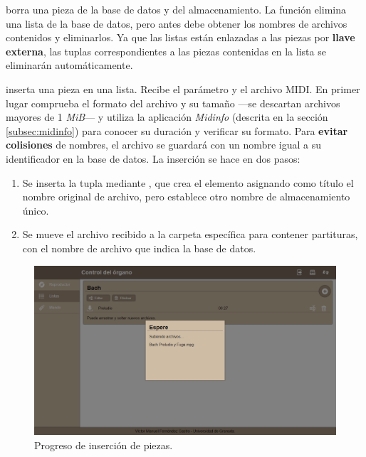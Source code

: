  borra una pieza de la base de datos y del almacenamiento. La función  elimina una lista de la base de datos, pero antes debe obtener los nombres de archivos contenidos y eliminarlos. Ya que las listas están enlazadas a las piezas por \textbf{llave externa}, las tuplas correspondientes a las piezas contenidas en la lista se eliminarán automáticamente.

 inserta una pieza en una lista. Recibe el parámetro  y el archivo \acrshort{MIDI}. En primer lugar comprueba el formato del archivo y su tamaño ---se descartan archivos mayores de 1 \textit{MiB}--- y utiliza la aplicación \textit{Midinfo} (descrita en la sección \ref{subsec:midinfo}) para conocer su duración y verificar su formato. Para \textbf{evitar colisiones} de nombres, el archivo se guardará con un nombre igual a su identificador en la base de datos. La inserción se hace en dos pasos:

\begin{enumerate}
	\item Se inserta la tupla mediante , que crea el elemento asignando como título el nombre original de archivo, pero establece otro nombre de almacenamiento único.
	
	\item Se mueve el archivo recibido a la carpeta específica para contener partituras, con el nombre de archivo que indica la base de datos.
\end{enumerate}

\smallskip

\begin{figure}[H]
	\noindent \begin{centering}
		\includegraphics[width=\linewidth*3/4]{capitulo5/cap_ins_pieza}
		\par\end{centering}
	\smallskip
	\caption{\label{fig:cap_ins_pieza} Progreso de inserción de piezas.}
\end{figure} 

